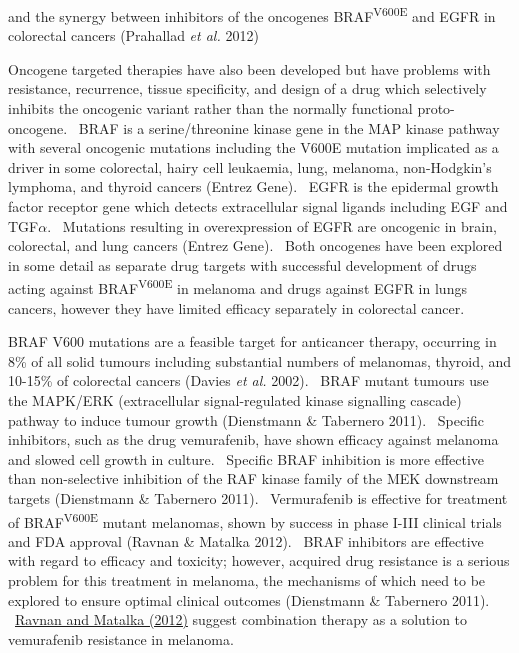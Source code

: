 and the synergy between inhibitors of the oncogenes BRAF\textsuperscript{V600E} and EGFR in colorectal cancers (Prahallad\textit{ et al.} 2012)

Oncogene targeted therapies have also been developed but have problems with resistance, recurrence, tissue specificity, and design of a drug which selectively inhibits the oncogenic variant rather than the normally functional proto-oncogene. \ BRAF is a serine/threonine kinase gene in the MAP kinase pathway with several oncogenic mutations including the V600E mutation implicated as a driver in some colorectal, hairy cell leukaemia, lung, melanoma, non-Hodgkin{\textquoteright}s lymphoma, and thyroid cancers (Entrez Gene). \ EGFR is the epidermal growth factor receptor gene which detects extracellular signal ligands including EGF and TGF$\alpha $. \ Mutations resulting in overexpression of EGFR are oncogenic in brain, colorectal, and lung cancers (Entrez Gene). \ Both oncogenes have been explored in some detail as separate drug targets with successful development of drugs acting against BRAF\textsuperscript{V600E} in melanoma and drugs against EGFR in lungs cancers, however they have limited efficacy separately in colorectal cancer. \  

BRAF V600 mutations are a feasible target for anticancer therapy, occurring in 8\% of all solid tumours including substantial numbers of melanomas, thyroid, and 10-15\% of colorectal cancers (Davies\textit{ et al.} 2002). \ BRAF mutant tumours use the MAPK/ERK (extracellular signal-regulated kinase signalling cascade) pathway to induce tumour growth (Dienstmann \& Tabernero 2011). \ Specific inhibitors, such as the drug vemurafenib, have shown efficacy against melanoma and slowed cell growth in culture. \ Specific BRAF inhibition is more effective than non-selective inhibition of the RAF kinase family of the MEK downstream targets (Dienstmann \& Tabernero 2011). \ Vermurafenib is effective for treatment of BRAF\textsuperscript{V600E} mutant melanomas, shown by success in phase I-III clinical trials and FDA approval (Ravnan \& Matalka 2012). \ BRAF inhibitors are effective with regard to efficacy and toxicity; however, acquired drug resistance is a serious problem for this treatment in melanoma, the mechanisms of which need to be explored to ensure optimal clinical outcomes (Dienstmann \& Tabernero 2011). \ \hyperlink{ENREF82}{Ravnan and Matalka (2012)} suggest combination therapy as a solution to vemurafenib resistance in melanoma. \  

